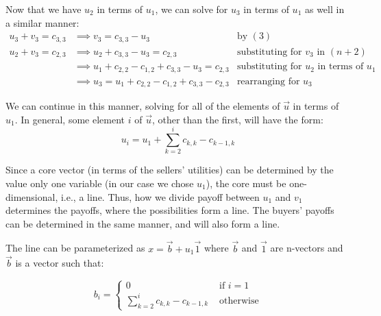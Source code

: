 \documentclass{article}
\begin{document}
\begin{enumerate}
Now that we have $u_{2}$ in terms of $u_{1}$, we can solve for $u_{3}$ in terms of $u_{1}$ as well in a similar manner:
\begin{align*}
u_{3} + v_{3} = c_{3,3} &\implies v_{3} = c_{3,3} - u_{3}             &\text{by } (3)   \\
u_{2} + v_{3} = c_{2,3} &\implies u_{2} + c_{3,3} - u_{3} = c_{2, 3}  &\text{substituting for } v_{3} \text{ in } (n + 2) \\
                        &\implies u_{1} + c_{2,2} - c_{1,2} + c_{3,3} - u_{3} = c_{2,3} &\text{substituting for } u_{2} \text{ in terms of } u_{1} \\
                        &\implies u_{3} = u_{1} + c_{2,2} - c_{1,2} + c_{3,3} - c_{2,3}   &\text{rearranging for } u_{3}
\end{align*}

We can continue in this manner, solving for all of the elements of $\vec{u}$ in terms of $u_{1}$. In general, some element $i$ of $\vec{u}$, other than the first, will have the form:
\[ u_{i} = u_{1} + \sum_{k = 2}^{i}{c_{k,k} - c_{k - 1, k}} \]

Since a core vector (in terms of the sellers' utilities) can be determined by the value only one variable (in our case we chose $u_{1}$), the core must be one-dimensional, i.e., a line. Thus, how we divide payoff between $u_{1}$ and $v_{1}$ determines the payoffs, where the possibilities form a line. The buyers' payoffs can be determined in the same manner, and will also form a line.

The line can be parameterized as $x = \vec{b} + u_{1}\vec{1}$ where $\vec{b}$ and $\vec{1}$ are n-vectors and $\vec{b}$ is a vector such that:

\[ b_{i} = \begin{cases}
  0                                         &\text{ if } i = 1            \\
  \sum_{k = 2}^{i}{c_{k,k} - c_{k - 1, k}}  &\text{ otherwise} 
\end{cases} \]
%
%

%
\end{enumerate}
%
\end{document}
